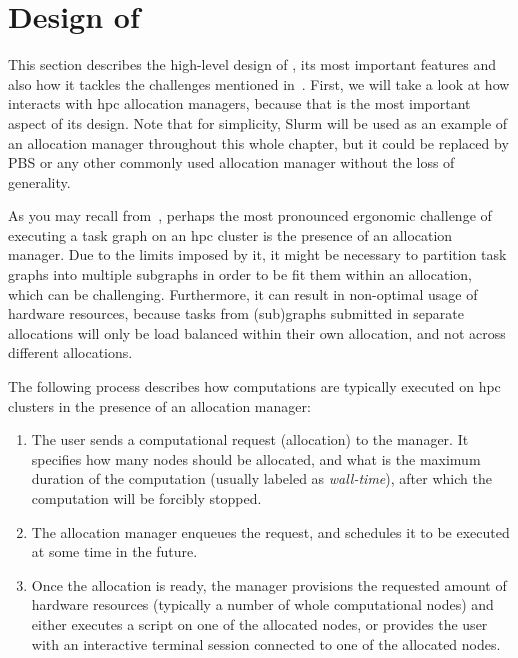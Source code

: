 
\section{Design of \hyperqueue{}}
\label{sec:hq-design}
This section describes the high-level design of \hyperqueue{}, its most important features
and also how it tackles the challenges mentioned in~. First, we will take a
look at how \hyperqueue{} interacts with \gls{hpc} allocation managers,
because that is the most important aspect of its design. Note that for simplicity, Slurm will be
used as an example of an allocation manager throughout this whole chapter, but it could be replaced
by PBS or any other commonly used allocation manager without the loss of generality.

As you may recall from~, perhaps the most pronounced ergonomic challenge of
executing a task graph on an \gls{hpc} cluster is the presence of an allocation
manager. Due to the limits imposed by it, it might be necessary to partition task graphs into
multiple subgraphs in order to be fit them within an allocation, which can be challenging.
Furthermore, it can result in non-optimal usage of hardware resources, because tasks from
(sub)graphs submitted in separate allocations will only be load balanced within their own
allocation, and not across different allocations.

The following process describes how computations are typically executed on \gls{hpc}
clusters in the presence of an allocation manager:

\begin{enumerate}
	\item The user sends a computational request (allocation) to the manager. It specifies how many nodes
	      should be allocated, and what is the maximum duration of the computation (usually labeled as
	      \emph{wall-time}), after which the computation will be forcibly stopped.
	\item The allocation manager enqueues the request, and schedules it to be executed at some time in the
	      future.
	\item Once the allocation is ready, the manager provisions the requested amount of hardware resources
	      (typically a number of whole computational nodes) and either executes a script on one of the
	      allocated nodes, or provides the user with an interactive terminal session connected to one of the
	      allocated nodes.
\end{enumerate}

